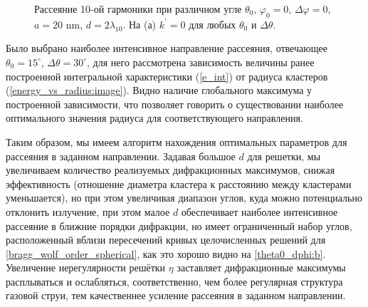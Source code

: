
    \begin{figure}[H]
        \hfil
        \caption{Рассеяние 10-ой гармоники при различном угле $\theta_0$, $\varphi_0 = 0$, $\Delta \varphi = 0$, $a = 20$ nm, $d = 2\lambda_{10}$. На (а) $k^\prime = 0$ для любых $\theta_0$ и $\Delta \theta$.}\label{theta0_dphi:image}
    \end{figure}


Было выбрано наиболее интенсивное направление рассеяния, отвечающее $\theta_0 = 15^\circ$, $\Delta \theta = 30^\circ$, для него рассмотрена зависимость величины ранее построенной интегральной характеристики (\autoref{e_int}) от радиуса кластеров (\autoref{energy_vs_radius:image}). Видно наличие глобального максимума у построенной зависимости, что позволяет говорить о существовании наиболее оптимального значения радиуса для соответствующего направления. 


Таким образом, мы имеем алгоритм нахождения оптимальных параметров для рассеяния в заданном направлении. Задавая большое $d$ для решетки, мы увеличиваем количество реализуемых дифракционных максимумов, снижая эффективность (отношение диаметра кластера к расстоянию между кластерами уменьшается), но при этом увеличивая диапазон углов, куда можно потенциально отклонить излучение, при этом малое $d$ обеспечивает наиболее интенсивное рассеяние в ближние порядки дифракции, но имеет ограниченный набор углов, расположенный вблизи пересечений кривых целочисленных решений для \autoref{bragg_wolf_order_spherical}, как это хорошо видно на \autoref{theta0_dphi:b}. Увеличение нерегулярности решётки $\eta$ заставляет дифракционные максимумы расплываться и ослабляться, соответственно, чем более регулярная структура газовой струи, тем качественнее усиление рассеяния в заданном направлении. 

